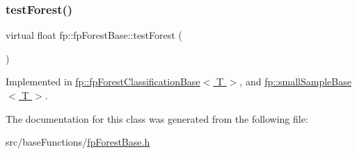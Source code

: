 \mbox{\label{classfp_1_1fpForestBase_af7becba028a198f650841b718d16ed16}} 
\subsubsection{\texorpdfstring{test\+Forest()}{testForest()}}
{\footnotesize\ttfamily virtual float fp\+::fp\+Forest\+Base\+::test\+Forest (\begin{DoxyParamCaption}{ }\end{DoxyParamCaption})\hspace{0.3cm}{\ttfamily [pure virtual]}}



Implemented in \hyperlink{classfp_1_1fpForestClassificationBase_a3f1ad5a5cfb3633713d0a81bd1c356e8}{fp\+::fp\+Forest\+Classification\+Base$<$ T $>$}, and \hyperlink{classfp_1_1smallSampleBase_a02b01949b6ed9cc6644b045a468609cc}{fp\+::small\+Sample\+Base$<$ T $>$}.



The documentation for this class was generated from the following file\+:\begin{DoxyCompactItemize}
\item 
src/base\+Functions/\hyperlink{fpForestBase_8h}{fp\+Forest\+Base.\+h}\end{DoxyCompactItemize}

